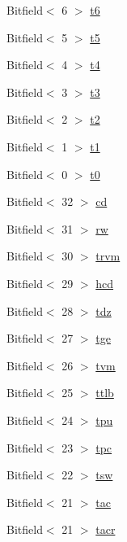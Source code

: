 \begin{DoxyCompactItemize}
\item 
Bitfield$<$ 6 $>$ \hyperlink{namespaceArmISA_ae5ce35260953d586fa93c509a1ae510a}{t6}
\item 
Bitfield$<$ 5 $>$ \hyperlink{namespaceArmISA_a6b36cbb74be8b1e48e1b9202e6b82464}{t5}
\item 
Bitfield$<$ 4 $>$ \hyperlink{namespaceArmISA_a98dc45e29698f24437852c7f0a16b20e}{t4}
\item 
Bitfield$<$ 3 $>$ \hyperlink{namespaceArmISA_a1a654d7bbb3e1974c88172302f9f6c8c}{t3}
\item 
Bitfield$<$ 2 $>$ \hyperlink{namespaceArmISA_a6b40ff8a6ee3b00e2f81f069c83c9363}{t2}
\item 
Bitfield$<$ 1 $>$ \hyperlink{namespaceArmISA_a4c801fe0f672da4105467acd21ff82ee}{t1}
\item 
Bitfield$<$ 0 $>$ \hyperlink{namespaceArmISA_af529973e29af949297af1cee4dd332bb}{t0}
\item 
Bitfield$<$ 32 $>$ \hyperlink{namespaceArmISA_a01196a5765729ed40157a908d7e41d51}{cd}
\item 
Bitfield$<$ 31 $>$ \hyperlink{namespaceArmISA_a84958c928579444646c525c79ead0dd7}{rw}
\item 
Bitfield$<$ 30 $>$ \hyperlink{namespaceArmISA_ad7249137617c59d36e365cf40b36c99b}{trvm}
\item 
Bitfield$<$ 29 $>$ \hyperlink{namespaceArmISA_ae93ee2c09127a18a761d1b232e652032}{hcd}
\item 
Bitfield$<$ 28 $>$ \hyperlink{namespaceArmISA_a7cca125cb84b3eae9deca84564ab7248}{tdz}
\item 
Bitfield$<$ 27 $>$ \hyperlink{namespaceArmISA_a90db3a7574837f3588c70a9eeee71d09}{tge}
\item 
Bitfield$<$ 26 $>$ \hyperlink{namespaceArmISA_af77457137cbbcd083946589f3c9c7ed2}{tvm}
\item 
Bitfield$<$ 25 $>$ \hyperlink{namespaceArmISA_a79cc7745279d09f9a7558a7da2e823b0}{ttlb}
\item 
Bitfield$<$ 24 $>$ \hyperlink{namespaceArmISA_a1fc818e5b6708a46acd5090b95a2833d}{tpu}
\item 
Bitfield$<$ 23 $>$ \hyperlink{namespaceArmISA_a5c4008671a2e65385d11fe229b2868cd}{tpc}
\item 
Bitfield$<$ 22 $>$ \hyperlink{namespaceArmISA_ac342bf93fd582d639f442b739df7abee}{tsw}
\item 
Bitfield$<$ 21 $>$ \hyperlink{namespaceArmISA_a0b231bc277f40cc4cab144b74033cdf5}{tac}
\item 
Bitfield$<$ 21 $>$ \hyperlink{namespaceArmISA_a53e1fc7029a9f2c0ce41b5b55f3f52f8}{tacr}

\end{DoxyCompactItemize}
